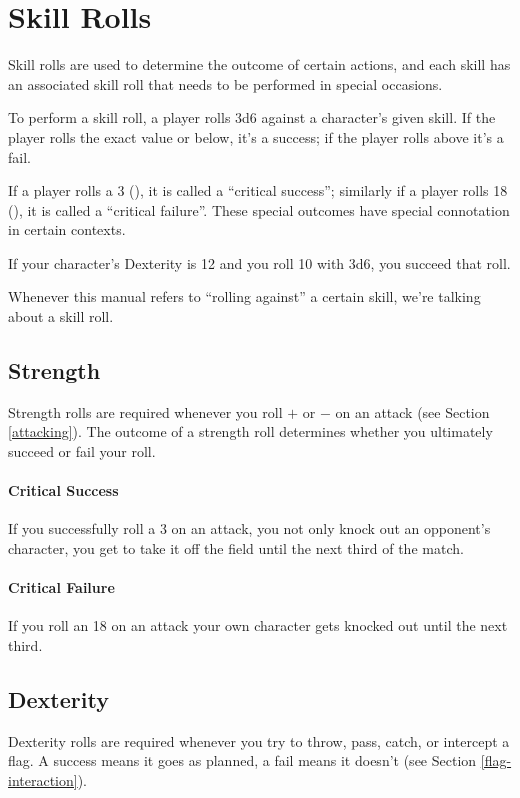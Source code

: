 \section{Skill Rolls}\label{skill-rolls}
Skill rolls are used to determine the outcome of certain actions, and each skill has an associated skill roll that needs to be performed in special occasions.

To perform a skill roll, a player rolls 3d6 against a character's given skill.
If the player rolls the exact value or below, it's a success; if the player rolls above it's a fail.

If a player rolls a 3 (), it is called a ``critical success''; similarly if a player rolls 18 (), it is called a ``critical failure''.
These special outcomes have special connotation in certain contexts.

\begin{example}
    If your character's Dexterity is 12 and you roll 10 with 3d6, you succeed that roll.
\end{example}

\begin{note}
    Whenever this manual refers to ``rolling against'' a certain skill, we're talking about a skill roll.
\end{note}

\subsection{Strength}
Strength rolls are required whenever you roll $+$ or $-$ on an attack (see Section \ref{attacking}).
The outcome of a strength roll determines whether you ultimately succeed or fail your roll.

\paragraph{Critical Success} If you successfully roll a 3 on an attack, you not only knock out an opponent's character, you get to take it off the field until the next third of the match.

\paragraph{Critical Failure} If you roll an 18 on an attack your own character gets knocked out until the next third.
\subsection{Dexterity}
Dexterity rolls are required whenever you try to throw, pass, catch, or intercept a flag.
A success means it goes as planned, a fail means it doesn't (see Section \ref{flag-interaction}).

